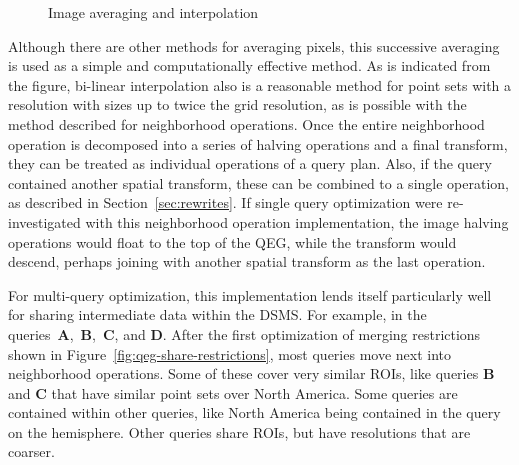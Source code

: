 \documentclass{ucdthesis}       %
\newcommand{\qry}[1]{{\bf #1}}
\begin{document}
\begin{figure}[htb]
  \centering
 \hspace*{1.5cm}
 \hfill
 \caption{Image averaging and interpolation}
 \label{fig:halve}
\end{figure} 

Although there are other methods for averaging pixels, this successive
averaging is used as a simple and computationally effective method.
As is indicated from the figure, bi-linear interpolation also is a
reasonable method for point sets with a resolution with sizes up to
twice the grid resolution, as is possible with the method described
for neighborhood operations.  Once the entire neighborhood operation
is decomposed into a series of halving operations and a final
transform, they can be treated as individual operations of a query
plan.  Also, if the query contained another spatial transform, these
can be combined to a single operation, as described in
Section~\ref{sec:rewrites}.  If single query optimization were
re-investigated with this neighborhood operation implementation, the
image halving operations would float to the top of the \ac{QEG}, while
the transform would descend, perhaps joining with another spatial
transform as the last operation.

For multi-query optimization, this implementation lends itself
particularly well for sharing intermediate data within the
\ac{DSMS}. For example, in the queries~\qry{A},~\qry{B},~\qry{C}, and
\qry{D}.  After the first optimization of merging restrictions shown
in Figure~\ref{fig:qeg-share-restrictions}, most queries move next
into neighborhood operations.  Some of these cover very similar
\acp{ROI}, like queries \qry{B} and \qry{C} that have similar
point sets over North America.  Some queries are contained within
other queries, like North America being contained in the query on the
hemisphere.  Other queries share \acp{ROI}, but have resolutions that
are coarser.
\end{document}
